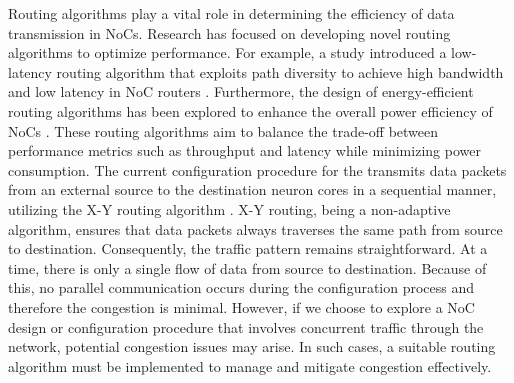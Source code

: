 Routing algorithms play a vital role in determining the efficiency of data transmission in NoCs.
Research has focused on developing novel routing algorithms to optimize performance.
For example, a study introduced a low-latency routing algorithm that exploits path diversity to achieve high bandwidth and low latency in NoC routers \cite{yangExploitingPathDiversity2012}.
Furthermore, the design of energy-efficient routing algorithms has been explored to enhance the overall power efficiency of NoCs \cite{parikhPowerAwareNoCsRouting2014}.
These routing algorithms aim to balance the trade-off between performance metrics such as throughput and latency while minimizing power consumption.
The current configuration procedure for the \graicore{} transmits data packets from an external source to the destination neuron cores in a sequential manner, utilizing the X-Y routing algorithm \cite{glassTurnModelAdaptive1992}.
X-Y routing, being a non-adaptive algorithm, ensures that data packets always traverses the same path from source to destination.
Consequently, the traffic pattern remains straightforward.
At a time, there is only a single flow of data from source to destination.
Because of this, no parallel communication occurs during the configuration process and therefore the congestion is minimal.
However, if we choose to explore a NoC design or configuration procedure that involves concurrent traffic through the network, potential congestion issues may arise.
In such cases, a suitable routing algorithm must be implemented to manage and mitigate congestion effectively.


